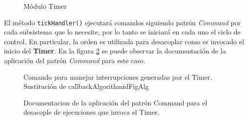 \begin{figure}[h!]
\caption{Módulo Timer}
\label{moduloTimer}
\begin{center}
\end{center}
\end{figure}

El método \verb|tickHandler()| ejecutará comandos siguiendo patrón \textit{Command} por cada subsistema que lo necesite, por lo tanto se iniciará en cada uno el ciclo de control. En particular, la orden es utilizada para desacoplar como es invocado el inicio del \textbf{Timer}. En la figura \ref{docCommandTimer} se puede observar la documentación de la aplicación del patrón \textit{Command} para este caso.

\begin{figure}
\caption{Documentacion de la aplicación del patrón Command para el desacople de ejecuciones que invoca el Timer.}
\label{docCommandTimer}
\begin{pattern}[]{Comando para manejar interrupciones generadas por el Timer.
Sustitución de callback}{Algorithm}{idFigAlg}
\assigns
{}
\end{pattern}
\end{figure}



